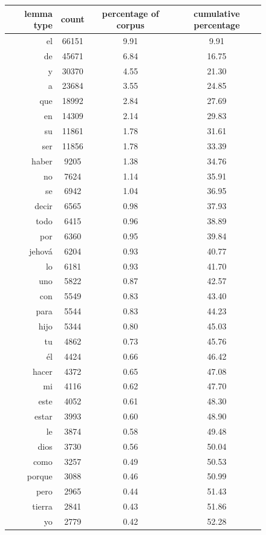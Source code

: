 \begin{figure}
  \begin{tiny}
  \begin{centering}
  \begin{tabular}{|r|c|c|c|}
    \hline
    lemma type & count & percentage of corpus & cumulative percentage \\
    \hline
el & 66151 & 9.91 & 9.91 \\
de & 45671 & 6.84 & 16.75 \\
y & 30370 & 4.55 & 21.30 \\
a & 23684 & 3.55 & 24.85 \\
que & 18992 & 2.84 & 27.69 \\
en & 14309 & 2.14 & 29.83 \\
su & 11861 & 1.78 & 31.61 \\
ser & 11856 & 1.78 & 33.39 \\
haber & 9205 & 1.38 & 34.76 \\
no & 7624 & 1.14 & 35.91 \\
se & 6942 & 1.04 & 36.95 \\
decir & 6565 & 0.98 & 37.93 \\
todo & 6415 & 0.96 & 38.89 \\
por & 6360 & 0.95 & 39.84 \\
jehová & 6204 & 0.93 & 40.77 \\
lo & 6181 & 0.93 & 41.70 \\
uno & 5822 & 0.87 & 42.57 \\
con & 5549 & 0.83 & 43.40 \\
para & 5544 & 0.83 & 44.23 \\
hijo & 5344 & 0.80 & 45.03 \\
tu & 4862 & 0.73 & 45.76 \\
él & 4424 & 0.66 & 46.42 \\
hacer & 4372 & 0.65 & 47.08 \\
mi & 4116 & 0.62 & 47.70 \\
este & 4052 & 0.61 & 48.30 \\
estar & 3993 & 0.60 & 48.90 \\
le & 3874 & 0.58 & 49.48 \\
dios & 3730 & 0.56 & 50.04 \\
como & 3257 & 0.49 & 50.53 \\
porque & 3088 & 0.46 & 50.99 \\
pero & 2965 & 0.44 & 51.43 \\
tierra & 2841 & 0.43 & 51.86 \\
yo & 2779 & 0.42 & 52.28 \\

\end{tabular}
\end{centering}
\end{tiny}
\end{figure}
